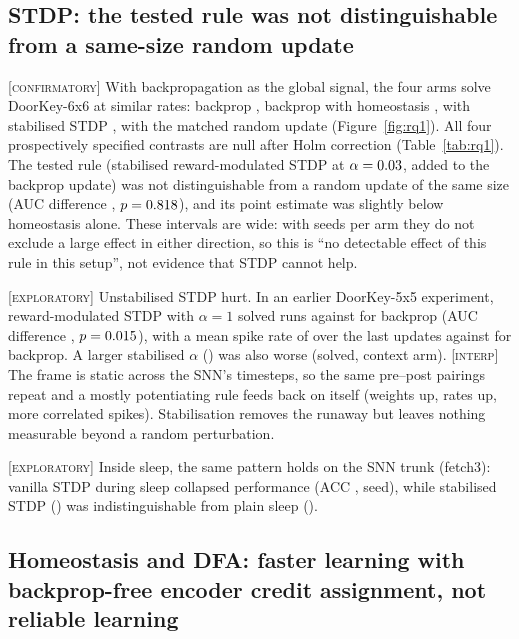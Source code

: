 \documentclass[10pt]{article}
\newcommand{\interp}{\textsc{[interp]}\xspace}
\newcommand{\conf}{\textsc{[confirmatory]}\xspace}
\newcommand{\expl}{\textsc{[exploratory]}\xspace}
\begin{document}
\subsection{STDP: the tested rule was not distinguishable from a same-size random update}
\label{sec:res-stdp}

\conf With backpropagation as the global signal, the four arms solve DoorKey-6x6 at similar rates: backprop
\rqOneBpSolved, backprop with homeostasis \rqOneHomeoSolved, with stabilised STDP \rqOneStdpSolved, with the matched
random update \rqOneRandSolved (Figure~\ref{fig:rq1}). All four prospectively specified contrasts are null after Holm
correction (Table~\ref{tab:rq1}). The tested rule (stabilised reward-modulated STDP at $\alpha=0.03$, added to
the backprop update) was not distinguishable from a random update of the same size (AUC difference
\rqOneContrBAucCi, $p=0.818$), and its point estimate was slightly below homeostasis alone. These intervals
are wide: with \rqOneBpN seeds per arm they do not exclude a large effect in either direction, so this is ``no
detectable effect of this rule in this setup'', not evidence that STDP cannot help.

\expl Unstabilised STDP hurt. In an earlier DoorKey-5x5 experiment, reward-modulated STDP with $\alpha=1$ solved
\vanillaStdpSolved runs against \vanillaBpSolved for backprop (AUC difference \vanillaStdpAucCi, $p=0.015$),
with a mean spike rate of \vanillaStdpRate over the last updates against \bpRate for backprop. A larger stabilised
$\alpha$ (\stdpAlphaLarge) was also worse (\rqOneStdpLargeSolved solved, context arm).
\interp The frame is static across the SNN's timesteps, so the same pre--post pairings repeat and a mostly
potentiating rule feeds back on itself (weights up, rates up, more correlated spikes). Stabilisation removes the
runaway but leaves nothing measurable beyond a random perturbation.

\expl Inside sleep, the same pattern holds on the SNN trunk (fetch3): vanilla STDP during sleep collapsed performance
(ACC \snnSleepVanillaStdpAcc, \snnSleepVanillaStdpN seed), while stabilised STDP (\snnSleepStabStdpAcc) was
indistinguishable from plain sleep (\accSnnSleep).

\subsection{Homeostasis and DFA: faster learning with backprop-free encoder credit assignment, not reliable learning}
\label{sec:res-homeo}
\end{document}
